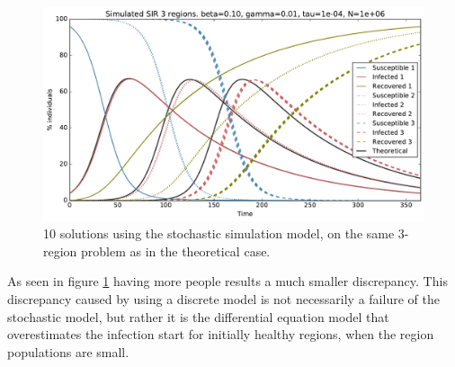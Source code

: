 \begin{figure}[H]
	\centering
	\includegraphics[width= 1.0 \linewidth]{plots/sir_three_region_sim_1000000.pdf}
	\caption{10 solutions using the stochastic simulation model, on the same 3-region problem as in the theoretical case.}
	\label{fig:sir_three_region_sim_1000000}
\end{figure}

As seen in figure \ref{fig:sir_three_region_sim_1000000} having more people results a much smaller discrepancy. This discrepancy caused by using a discrete model is not necessarily a failure of the stochastic model, but rather it is the differential equation model that overestimates the infection start for initially healthy regions, when the region populations are small.
